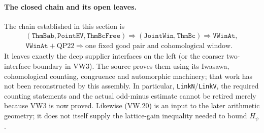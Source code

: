\paragraph{The closed chain and its open leaves.}
The chain established in this section is
\[
 \begin{gathered}
 (\mathtt{ThmBab},\mathtt{PointHV},\mathtt{ThmBcFree})
 \Longrightarrow(\mathtt{JointWin},\mathtt{ThmBc})
 \Longrightarrow\mathtt{VWinAt},\\
 \mathtt{VWinAt}+\mathrm{QP22}
 \Longrightarrow\text{one fixed good pair and cohomological window}.
 \end{gathered}
\]
It leaves exactly the deep supplier interfaces on the left (or the
coarser two-interface boundary in VW3).  The source proves them using
its Iwasawa, cohomological counting, congruence and automorphic machinery;
that work has not been reconstructed by this assembly.  In particular,
\texttt{LinkN}/\texttt{LinkV}, the required counting statements and the
actual odd-minus estimate cannot be retired merely because VW3 is now
proved.  Likewise (VW.20) is an input to the later arithmetic geometry;
it does not itself supply the lattice-gain inequality needed to bound
$H_\psi$.
